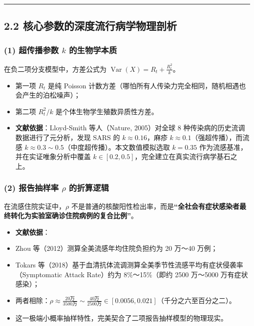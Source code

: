 \documentclass[11pt,a4paper]{ctexart}
\begin{document}
\vspace{0.8em}\hrule\vspace{0.8em}

\subsection{2.2 核心参数的深度流行病学物理剖析}

\subsubsection{(1) 超传播参数 $k$ 的生物学本质}
在负二项分支模型中，方差公式为 $\operatorname{Var}(X) = R_t + \frac{R_t^2}{k}$。

\begin{itemize}[leftmargin=2em, itemsep=2pt, parsep=0pt]
\item 第一项 $R_t$ 是纯 Poisson 计数方差（哪怕所有人传染力完全相同，随机相遇也会产生的泊松噪声）；
\item 第二项 $R_t^2/k$ 是个体生物学生殖数异质性方差。
\item \textbf{文献依据}：Lloyd-Smith 等人（Nature, 2005）对全球 8 种传染病的历史流调数据进行了元分析，发现 SARS 的 $k \approx 0.16$，麻疹 $k \approx 0.1$（强超传播），而流感 $k \approx 0.3 \sim 0.5$（中度超传播）。本文数值模拟选取 $k = 0.35$ 作为流感基准，并在实证唯象分析中覆盖 $k \in [0.2, 0.5]$，完全建立在真实流行病学基石之上。
\end{itemize}

\subsubsection{(2) 报告抽样率 $\rho$ 的折算逻辑}
在流感住院实证中，$\rho$ 不是普通的核酸阳性检出率，而是\textbf{“全社会有症状感染者最终转化为实验室确诊住院病例的复合比例”}。

\begin{itemize}[leftmargin=2em, itemsep=2pt, parsep=0pt]
\item \textbf{文献依据}：
\item Zhou 等（2012）测算全美流感年均住院负担约为 20 万～40 万例；
\item Tokars 等（2018）基于血清抗体流调测算全美季节性流感平均有症状侵袭率（Symptomatic Attack Rate）约为 8\%～15\%（即约 2500 万～5000 万有症状感染）；
\item 两者相除：$\rho \approx \frac{20\text{万}}{3500\text{万}} \sim \frac{40\text{万}}{2500\text{万}} \in [0.0056, 0.021]$（千分之六至百分之二）。
\item 这一极端小概率抽样特性，完美契合了二项报告抽样模型的物理现实。
\end{itemize}
\end{document}
